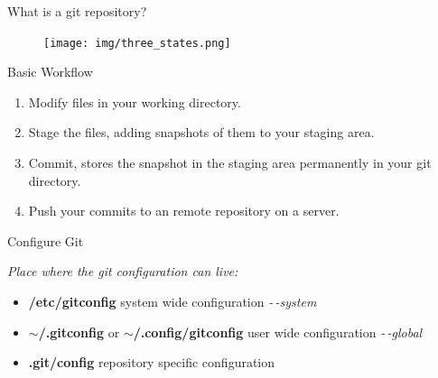 \begin{frame}{What is a git repository?}

    \begin{figure}
        \centering
        \texttt{[image: img/three\_states.png]}
    \end{figure}
\end{frame}

\begin{frame}{Basic Workflow}
    \begin{enumerate}
        \item Modify files in your working directory.
        \item Stage the files, adding snapshots of them to your staging area.
        \item Commit, stores the snapshot in the staging area permanently in
            your git directory.
        \item Push your commits to an remote repository on a server.
    \end{enumerate}
\end{frame}


\begin{frame}{Configure Git}

    \emph{Place where the git configuration can live:}
    \vspace{1cm}

    \begin{itemize}
            \item \textbf{/etc/gitconfig} system wide configuration
                \textit{-\,-system}
            \item \textbf{$\sim$/.gitconfig} or \textbf{$\sim$/.config/gitconfig}  user wide configuration \textit{-\,-global}
            \item \textbf{.git/config} repository specific configuration
    \end{itemize}

\end{frame}

